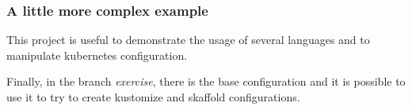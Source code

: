 	\begin{frame}
		\frametitle{A little more complex example}
		
		This project is useful to demonstrate the usage of several languages and to manipulate kubernetes configuration.
		
		\medskip
		
		Finally, in the branch \textit{exercise}, there is the base configuration and it is possible to use it to try to create kustomize and skaffold configurations.
	\end{frame}